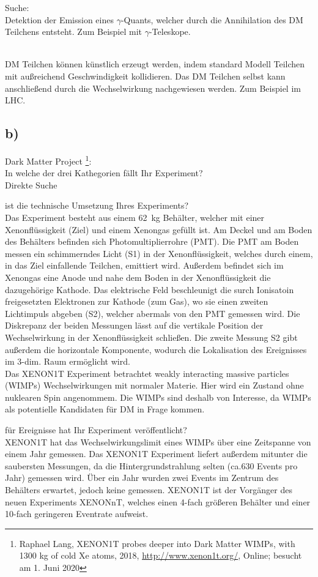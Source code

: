     \justifying Suche:\\
    Detektion der Emission eines $\gamma$-Quants, welcher durch die Annihilation des DM Teilchens entsteht. Zum Beispiel mit $\gamma$-Teleskope.

    \justifying\\
    DM Teilchen können künstlich erzeugt werden, indem standard Modell Teilchen mit außreichend Geschwindigkeit kollidieren. Das DM Teilchen selbst kann anschließend
    durch die Wechselwirkung nachgewiesen werden. Zum Beispiel im LHC.

\subsection{b)}

    \justifying Dark Matter Project \footnote{Raphael Lang, XENON1T probes deeper into Dark Matter WIMPs, with 1300 kg of cold Xe atoms, 
    2018, \url{http://www.xenon1t.org/}, Online; besucht am 1. Juni 2020}:\\
    In welche der drei Kathegorien fällt Ihr Experiment?\\
    Direkte Suche

    \justifying ist die technische Umsetzung Ihres Experiments?\\
    Das Experiment besteht aus einem \SI{62}{\kilo\gram} Behälter, welcher mit einer Xenonflüssigkeit (Ziel) und einem Xenongas gefüllt ist. Am Deckel und am Boden des
    Behälters befinden sich Photomultiplierrohre (PMT). Die PMT am Boden messen ein schimmerndes Licht (S1) in der Xenonflüssigkeit, welches durch einem, in das Ziel einfallende 
    Teilchen, emittiert wird. Außerdem befindet sich im Xenongas eine Anode und nahe dem Boden in der Xenonflüssigkeit die dazugehörige Kathode. Das elektrische Feld beschleunigt 
    die surch Ionisatoin freigesetzten Elektronen zur Kathode (zum Gas), wo sie einen zweiten Lichtimpuls abgeben (S2), welcher abermals von den PMT gemessen wird. Die Diskrepanz der beiden Messungen lässt auf 
    die vertikale Position der Wechselwirkung in der Xenonflüssigkeit schließen. Die zweite Messung S2 gibt außerdem die horizontale Komponente, wodurch die Lokalisation des 
    Ereignisses im 3-dim. Raum ermöglicht wird.\\
    Das XENON1T Experiment betrachtet weakly interacting massive particles (WIMPs) Wechselwirkungen mit normaler Materie. Hier wird ein Zustand ohne nuklearen Spin angenommem. 
    Die WIMPs sind deshalb von Interesse, da WIMPs als potentielle Kandidaten für DM in Frage kommen. 

    \justifying für Ereignisse hat Ihr Experiment veröffentlicht?\\
    XENON1T hat das Wechselwirkungslimit eines WIMPs über eine Zeitspanne von einem Jahr gemessen. Das XENON1T Experiment liefert außerdem mitunter die saubersten Messungen, da
    die Hintergrundstrahlung selten (ca.630 Events pro Jahr) gemessen wird. Über ein Jahr wurden zwei Events im Zentrum des Behälters erwartet, jedoch keine gemessen. XENON1T 
    ist der Vorgänger des neuen Experiments XENONnT, welches einen 4-fach größeren Behälter und einer 10-fach geringeren Eventrate aufweist.

